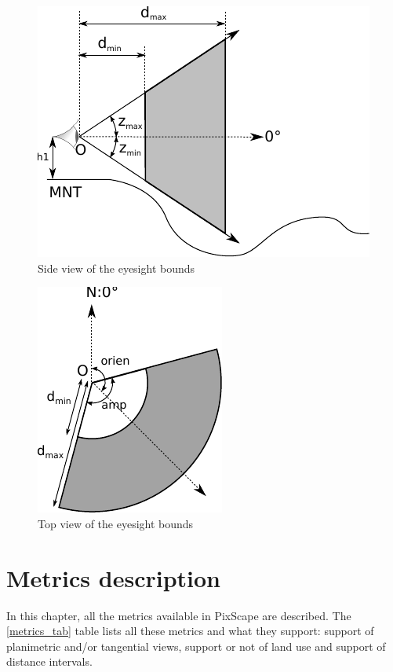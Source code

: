 \documentclass{report}
\begin{document}
\begin{figure}[H]
	\includegraphics{img/bounds_side.pdf} 
	\caption{Side view of the eyesight bounds}
	\label{bounds_side}
\end{figure}

\begin{figure}[H]
	\includegraphics{img/bounds_2d.pdf} 
	\caption{Top view of the eyesight bounds}
	\label{bounds_2d}
\end{figure}


\chapter{Metrics description}
\label{metrics}
In this chapter, all the metrics available in PixScape are described. The \ref{metrics_tab} table lists all these metrics and what they support: support of planimetric and/or tangential views, support or not of land use and support of distance intervals.
\end{document}
